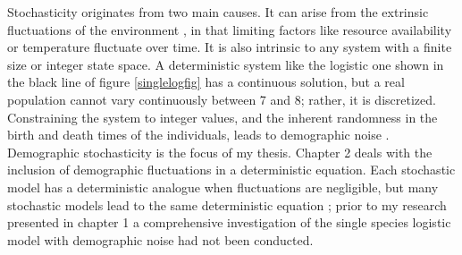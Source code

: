 Stochasticity originates from two main causes. 
It can arise from the extrinsic fluctuations of the environment \cite{Kamenev2008a,Chotibut2017a}, in that limiting factors like resource availability or temperature fluctuate over time. 
It is also intrinsic to any system with a finite size or integer state space. 
A deterministic system like the logistic one shown in the black line of figure \ref{singlelogfig} has a continuous solution, but a real population cannot vary continuously between 7 and 8; rather, it is discretized. %
Constraining the system to integer values, and the inherent randomness in the birth and death times of the individuals, leads to demographic noise \cite{Assaf2006,Gottesman2012,Dobrinevski2012,Gabel2013,Fisher2014,Constable2015,Lin2012,Chotibut2015,Young2018}. 
Demographic stochasticity is the focus of my thesis. 
Chapter 2 deals with the inclusion of demographic fluctuations in a deterministic equation. 
Each stochastic model has a deterministic analogue when fluctuations are negligible, but many stochastic models lead to the same deterministic equation \cite{Nisbet1982,Norden1982,Nasell2001,Rouzine2001,Gardiner2004a}; prior to my research presented in chapter 1 a comprehensive investigation of the single species logistic model with demographic noise had not been conducted. %

